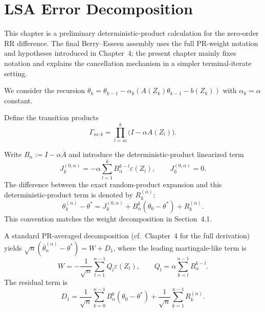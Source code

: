 \section{LSA Error Decomposition}

This chapter is a preliminary deterministic-product calculation for the
zero-order RR difference. The final Berry--Esseen assembly uses the full
PR-weight notation and hypotheses introduced in Chapter~4; the present chapter
mainly fixes notation and explains the cancellation mechanism in a simpler
terminal-iterate setting.

We consider the recursion
$\theta_k=\theta_{k-1}-\alpha_k(A(Z_k)\theta_{k-1}-b(Z_k))$ with
$\alpha_k=\alpha$ constant.

Define the transition products
\[
  \Gamma_{m:k}=\prod_{l=m}^k\bigl(I-\alpha A(Z_l)\bigr).
\]

Write $B_\alpha:=I-\alpha\overline{A}$ and introduce the
deterministic-product linearized term
\[
  J_k^{(0,\alpha)}
    =-\alpha\sum_{l=1}^kB_\alpha^{k-l}\varepsilon(Z_l),
  \qquad J_0^{(0,\alpha)}=0.
\]
The difference between the exact random-product expansion and this
deterministic-product term is denoted by $R_k^{(\alpha)}$:
\[
  \theta_k^{(\alpha)}-\theta^*
    =J_k^{(0,\alpha)}+B_\alpha^k(\theta_0-\theta^*)+R_k^{(\alpha)}.
\]
This convention matches the weight decomposition in Section~4.1.

A standard PR-averaged decomposition (cf.\ Chapter~4 for the full derivation)
yields
$\sqrt{n}(\overline{\theta}_n^{(\alpha)}-\theta^*)=W+D_1$, where the
leading martingale-like term is
\[
  W=-\frac{1}{\sqrt{n}}\sum_{l=1}^{n-1}Q_l\varepsilon(Z_l),
  \qquad
  Q_l=\alpha\sum_{k=l}^{n-1}B_\alpha^{k-l}.
\]
The residual term is
\[
  D_1
    =\frac{1}{\sqrt{n}}\sum_{k=0}^{n-1}
      B_\alpha^k(\theta_0-\theta^*)
     +\frac{1}{\sqrt{n}}\sum_{k=1}^{n-1}R_k^{(\alpha)}.
\]
